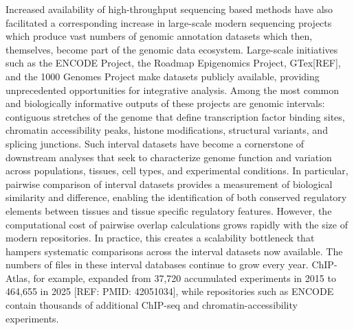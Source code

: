\documentclass[11pt]{article}
\begin{document}
Increased availability of high-throughput sequencing based methods have also facilitated a corresponding increase in large-scale modern sequencing projects which produce vast numbers of genomic annotation datasets which then, themselves, become part of the genomic data ecosystem. Large-scale initiatives such as the ENCODE Project\cite{encode_2012}, the Roadmap Epigenomics Project\cite{roadmap_2015}, GTex[REF], and the 1000 Genomes Project\cite{10002015global} make datasets publicly available, providing unprecedented opportunities for integrative analysis. Among the most common and biologically informative outputs of these projects are genomic intervals: contiguous stretches of the genome that define transcription factor binding sites, chromatin accessibility peaks, histone modifications, structural variants, and splicing junctions. Such interval datasets have become a cornerstone of downstream analyses that seek to characterize genome function and variation across populations, tissues, cell types, and experimental conditions. In particular, pairwise comparison of interval datasets provides a measurement of biological similarity and difference, enabling the identification of both conserved regulatory elements between tissues and tissue specific regulatory features. However, the computational cost of pairwise overlap calculations grows rapidly with the size of modern repositories. In practice, this creates a scalability bottleneck that hampers systematic comparisons across the interval datasets now available\cite{li2020design}.
The numbers of files in these interval databases continue to grow every year. ChIP-Atlas, for example, expanded from 37,720 accumulated experiments in 2015 to 464,655 in 2025 [REF: PMID: 42051034], while repositories such as ENCODE contain thousands of additional ChIP-seq and chromatin-accessibility experiments.
\end{document}
